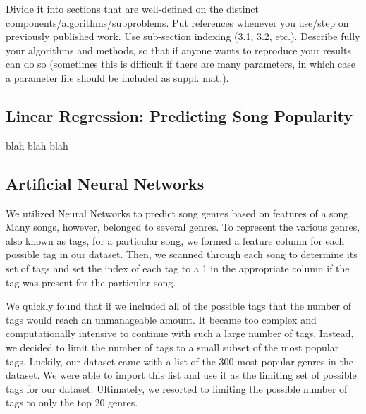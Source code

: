 \documentclass[12pt]{article}
\begin{document}
 Divide it into sections that are well-defined on the distinct components/algorithms/subproblems.
 Put references whenever you use/step on previously published work. Use sub-section
 indexing (3.1, 3.2, etc.). Describe fully your algorithms and methods, so that if anyone wants to
 reproduce your results can do so (sometimes this is difficult if there are many parameters, in
 which case a parameter file should be included as suppl. mat.).

\subsection{Linear Regression: Predicting Song Popularity}
\label{subsec:linearRegression}
blah blah blah

\subsection{Artificial Neural Networks}
\label{subsec:ann}
We utilized Neural Networks to predict song genres based on features of a song. Many songs, however, belonged to several genres. To represent the various genres, also known as tags, for a particular song, we formed a feature column for each possible tag in our dataset. Then, we scanned through each song to determine its set of tags and set the index of each tag to a 1 in the appropriate column if the tag was present for the particular song. 

We quickly found that if we included all of the possible tags that the number of tags would reach an unmanageable amount. It became too complex and computationally intensive to continue with such a large number of tags. Instead, we decided to limit the number of tags to a small subset of the most popular tags. Luckily, our dataset came with a list of the 300 most popular genres in the dataset. We were able to import this list and use it as the limiting set of possible tags for our dataset. Ultimately, we resorted to limiting the possible number of tags to only the top 20 genres.
\end{document}
